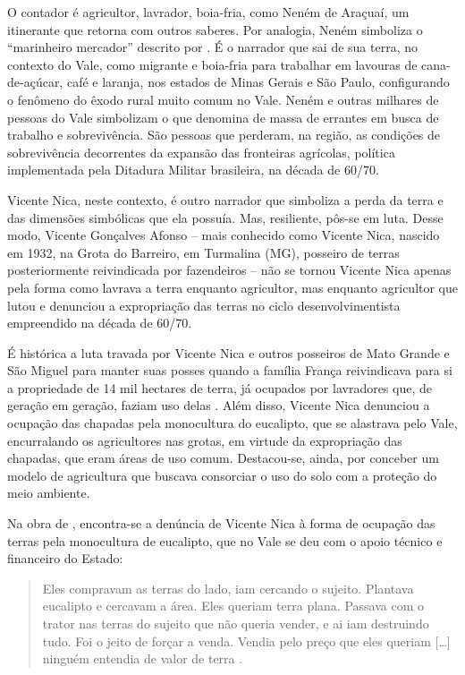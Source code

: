 \documentclass[portuguese]{textolivre}
\begin{document}
O contador é agricultor, lavrador, boia-fria, como Neném de Araçuaí, um itinerante que retorna com outros saberes. Por analogia, Neném simboliza o “marinheiro mercador” descrito por \textcite{Benjamin1985}. É o narrador que sai de sua terra, no contexto do Vale, como migrante e boia-fria para trabalhar em lavouras de cana-de-açúcar, café e laranja, nos estados de Minas Gerais e São Paulo, configurando o fenômeno do êxodo rural muito comum no Vale. Neném e outras milhares de pessoas do Vale simbolizam o que \textcite{Silva1999} denomina de massa de errantes em busca de trabalho e sobrevivência. São pessoas que perderam, na região, as condições de sobrevivência decorrentes da expansão das fronteiras agrícolas, política implementada pela Ditadura Militar brasileira, na década de 60/70.

Vicente Nica, neste contexto, é outro narrador que simboliza a perda da terra e das dimensões simbólicas que ela possuía. Mas, resiliente, pôs-se em luta. Desse modo, Vicente Gonçalves Afonso – mais conhecido como Vicente Nica, nascido em 1932, na Grota do Barreiro, em Turmalina (MG), posseiro de terras posteriormente reivindicada por fazendeiros – não se tornou Vicente Nica apenas pela forma como lavrava a terra enquanto agricultor, mas enquanto agricultor que lutou e denunciou a expropriação das terras no ciclo desenvolvimentista empreendido na década de 60/70.

É histórica a luta travada por Vicente Nica e outros posseiros de Mato Grande e São Miguel para manter suas posses quando a família França reivindicava para si a propriedade de 14 mil hectares de terra, já ocupados por lavradores que, de geração em geração, faziam uso delas \cite{Leite2015}. Além disso, Vicente Nica denunciou a ocupação das chapadas pela monocultura do eucalipto, que se alastrava pelo Vale, encurralando os agricultores nas grotas, em virtude da expropriação das chapadas, que eram áreas de uso comum. Destacou-se, ainda, por conceber um modelo de agricultura que buscava consorciar o uso do solo com a proteção do meio ambiente.

Na obra de \textcite{Silva1999}, encontra-se a denúncia de Vicente Nica à forma de ocupação das terras pela monocultura de eucalipto, que no Vale se deu com o apoio técnico e financeiro do Estado:

\begin{quote}
    Eles compravam as terras do lado, iam cercando o sujeito. Plantava eucalipto e cercavam a área. Eles queriam terra plana. Passava com o trator nas terras do sujeito que não queria vender, e ai iam destruindo tudo. Foi o jeito de forçar a venda. Vendia pelo preço que eles queriam […] ninguém entendia de valor de terra \cite[p. 59]{Silva1999}.
\end{quote}
\end{document}
